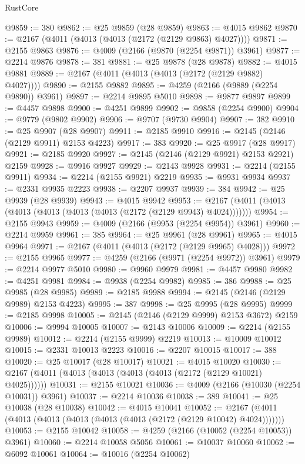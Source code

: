 \begin{lexlean}{RustCore}
\begin{coremodule}
@9859 := 380
@9862 := @25 @9859 (@28 @9859)
@9863 := @4015 @9862
@9870 := @2167 (@4011 (@4013 (@4013 (@2172 (@2129 @9863) @4027))))
@9871 := @2155 @9863
@9876 := @4009 (@2166 (@9870 (@2254 @9871)) @3961)
@9877 := @2214 @9876
@9878 := 381
@9881 := @25 @9878 (@28 @9878)
@9882 := @4015 @9881
@9889 := @2167 (@4011 (@4013 (@4013 (@2172 (@2129 @9882) @4027))))
@9890 := @2155 @9882
@9895 := @4259 (@2166 (@9889 (@2254 @9890)) @3961)
@9897 := @2214 @9895 @5010
@9898 := @9877 @9897
@9899 := @4457 @9898
@9900 := @4251 @9899
@9902 := @9858 (@2254 @9900)
@9904 := @9779 (@9802 @9902)
@9906 := @9707 (@9730 @9904)
@9907 := 382
@9910 := @25 @9907 (@28 @9907)
@9911 := @2185 @9910
@9916 := @2145 (@2146 (@2129 @9911) @2153 @4223)
@9917 := 383
@9920 := @25 @9917 (@28 @9917)
@9921 := @2185 @9920
@9927 := @2145 (@2146 (@2129 @9921) @2153 @2921) @2159
@9928 := @9916 @9927
@9929 := @2143 @9928
@9931 := @2214 (@2155 @9911)
@9934 := @2214 (@2155 @9921) @2219
@9935 := @9931 @9934
@9937 := @2331 @9935 @2223
@9938 := @2207 @9937
@9939 := 384
@9942 := @25 @9939 (@28 @9939)
@9943 := @4015 @9942
@9953 := @2167 (@4011 (@4013 (@4013 (@4013 (@4013 (@4013 (@2172 (@2129 @9943) @4024)))))))
@9954 := @2155 @9943
@9959 := @4009 (@2166 (@9953 (@2254 @9954)) @3961)
@9960 := @2214 @9959
@9961 := 385
@9964 := @25 @9961 (@28 @9961)
@9965 := @4015 @9964
@9971 := @2167 (@4011 (@4013 (@2172 (@2129 @9965) @4028)))
@9972 := @2155 @9965
@9977 := @4259 (@2166 (@9971 (@2254 @9972)) @3961)
@9979 := @2214 @9977 @5010
@9980 := @9960 @9979
@9981 := @4457 @9980
@9982 := @4251 @9981
@9984 := @9938 (@2254 @9982)
@9985 := 386
@9988 := @25 @9985 (@28 @9985)
@9989 := @2185 @9988
@9994 := @2145 (@2146 (@2129 @9989) @2153 @4223)
@9995 := 387
@9998 := @25 @9995 (@28 @9995)
@9999 := @2185 @9998
@10005 := @2145 (@2146 (@2129 @9999) @2153 @3672) @2159
@10006 := @9994 @10005
@10007 := @2143 @10006
@10009 := @2214 (@2155 @9989)
@10012 := @2214 (@2155 @9999) @2219
@10013 := @10009 @10012
@10015 := @2331 @10013 @2223
@10016 := @2207 @10015
@10017 := 388
@10020 := @25 @10017 (@28 @10017)
@10021 := @4015 @10020
@10030 := @2167 (@4011 (@4013 (@4013 (@4013 (@4013 (@2172 (@2129 @10021) @4025))))))
@10031 := @2155 @10021
@10036 := @4009 (@2166 (@10030 (@2254 @10031)) @3961)
@10037 := @2214 @10036
@10038 := 389
@10041 := @25 @10038 (@28 @10038)
@10042 := @4015 @10041
@10052 := @2167 (@4011 (@4013 (@4013 (@4013 (@4013 (@4013 (@2172 (@2129 @10042) @4024)))))))
@10053 := @2155 @10042
@10058 := @4259 (@2166 (@10052 (@2254 @10053)) @3961)
@10060 := @2214 @10058 @5056
@10061 := @10037 @10060
@10062 := @6092 @10061
@10064 := @10016 (@2254 @10062)

\end{coremodule}
\end{lexlean}
